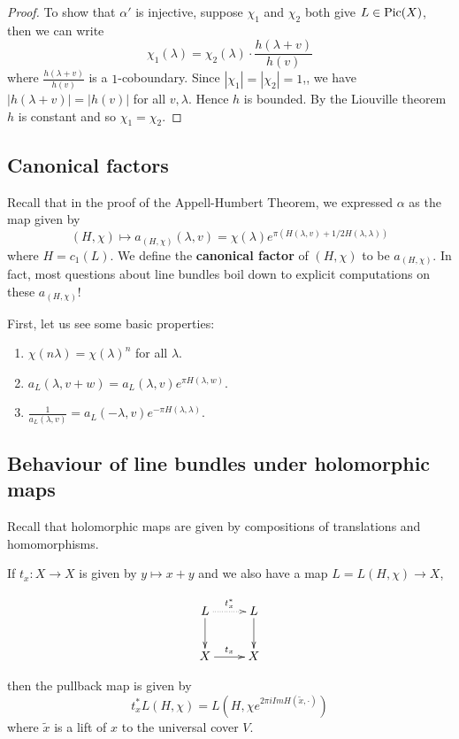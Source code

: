 \begin{proof}
To show that $\alpha'$ is injective, 
suppose $\chi_1$ and $\chi_2$ both give $L\in \operatorname{Pic}(X)$, then we can write
$$\chi_1(\lambda)=\chi_2(\lambda)\cdot \frac{h(\lambda+v)}{h(v)}$$
where $\frac{h(\lambda+v)}{h(v)}$ is a $1$-coboundary. Since $|\chi_1|=|\chi_2|=1$,, we have $|h(\lambda+v)|=|h(v)|$ for all $v,\lambda$. Hence $h$ is bounded. By the Liouville theorem $h$ is constant and so $\chi_1=\chi_2$. 

\end{proof}


\subsection{Canonical factors}
Recall that in the proof of the Appell-Humbert Theorem, we expressed $\alpha$ as the map given by 
$$(H,\chi)\mapsto a_{(H,\chi)} (\lambda,v)=\chi(\lambda)e^{\pi (H(\lambda,v)+1/2 H(\lambda,\lambda))}$$
where $H=c_1(L)$. We define the \textbf{canonical factor} of $(H,\chi)$ to be $a_{(H,\chi)}$. In fact, most questions about line bundles boil down to explicit computations on these $a_{(H,\chi)}$! 

First, let us see some basic properties:
\begin{enumerate}
\item $\chi(n\lambda)=\chi(\lambda)^n$ for all $\lambda$.
\item $a_L(\lambda,v+w)=a_L(\lambda,v)e^{\pi H(\lambda,w)}$.
\item $\frac{1}{a_L(\lambda,v)}=a_L(-\lambda,v)e^{-\pi H(\lambda,\lambda)}$. 
\end{enumerate}

\subsection{Behaviour of line bundles under holomorphic maps}
Recall that holomorphic maps are given by compositions of translations and homomorphisms. 

\begin{lemma}
If $t_x:X\to X$ is given by $y\mapsto x+y$ and we also have a map $L=L(H,\chi)\to X$, 

\[
\xymatrix{
L \ar@{.>}[r]^{t^*_x} \ar[d] & L \ar[d]\\
X \ar[r]^{t_x} & X\\
}
\]


then the pullback map is given by  
$$t_x^* L(H,\chi)=L(H,\chi e^{2\pi i Im H(\tilde{x},\cdot)})$$
where $\tilde{x}$ is a lift of $x$ to the universal cover $V$. 
\end{lemma}


